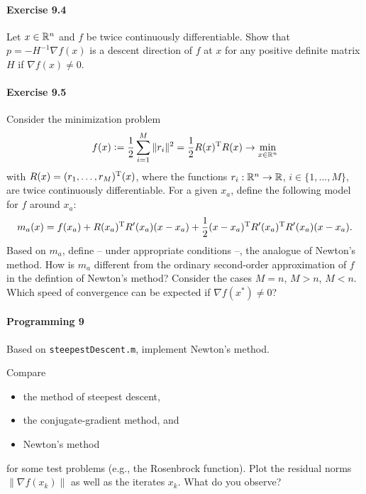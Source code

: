 \paragraph{Exercise 9.4}
Let $x \in \mathbb{R}^n$ and $f$ be twice continuously differentiable. Show that $p =
-H^{-1}\nabla f(x)$ is a descent direction of $f$ at $x$ for any positive
definite matrix $H$ if $\nabla f(x) \neq 0$.


\paragraph{Exercise 9.5}
Consider the minimization problem
\[
  f(x)\mathrel{\mathop:}= \frac{1}{2}\sum_{i=1}^M\|r_i\|^2 = \frac{1}{2}R(x)^{\text{\upshape T}} R(x) \to \min_{x\in\mathbb{R}^n}
\]
with $R(x)=(r_1,\dots,r_M)^{\text{\upshape T}}(x)$, where the functions $r_i:\mathbb{R}^n\to\mathbb{R}$, $i\in\{1,\dots,M\}$, are twice continuously differentiable. For a given $x_a$, define the following model for $f$ around $x_a$:
\[
  m_a(x) = f(x_a)
         + R(x_a)^{\text{\upshape T}} R'(x_a)(x-x_a)
         + \frac{1}{2} (x-x_a)^{\text{\upshape T}} R'(x_a)^{\text{\upshape T}} R'(x_a)(x-x_a).
\]
Based on $m_a$, define -- under appropriate conditions --, the analogue of
Newton's method. How is $m_a$ different from the ordinary second-order
approximation of $f$ in the defintion of Newton's method? Consider the cases
$M=n$, $M>n$, $M<n$. Which speed of convergence can be expected if $\nabla
f(x^*)\neq 0$?

\paragraph{Programming 9}
Based on \texttt{steepestDescent.m}, implement Newton's method.

Compare
\begin{itemize}
  \item the method of steepest descent,
  \item the conjugate-gradient method, and
  \item Newton's method
\end{itemize}
for some test problems (e.g., the Rosenbrock function). Plot the residual
norms $\|\nabla f(x_k)\|$ as well as the iterates $x_k$. What do you observe?


